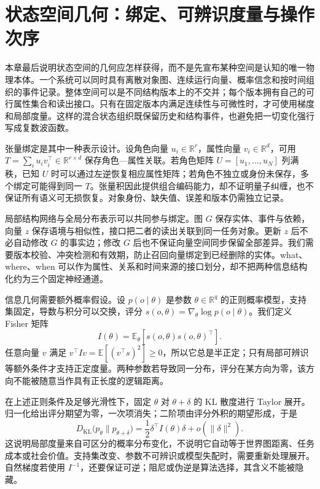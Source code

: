 \section{状态空间几何：绑定、可辨识度量与操作次序}
\label{sec:cognitive_space_ontology}

本章最后说明状态空间的几何应怎样获得，而不是先宣布某种空间是认知的唯一物理本体。一个系统可以同时具有离散对象图、连续运行向量、概率信念和按时间组织的事件记录。整体空间可以是不同结构版本上的不交并；每个版本拥有自己的可行属性集合和读出接口。只有在固定版本内满足连续性与可微性时，才可使用梯度和局部度量。这样的混合状态组织既保留历史和结构事件，也避免把一切变化强行写成复数波函数。

张量绑定是其中一种表示设计。设角色向量 $u_i\in\mathbb R^r$，属性向量 $v_i\in\mathbb R^d$，可用 $T=\sum_i u_i v_i^\top\in\mathbb R^{r\times d}$ 保存角色—属性关联。若角色矩阵 $U=[u_1,\ldots,u_N]$ 列满秩，已知 $U$ 时可以通过左逆恢复相应属性矩阵；若角色不独立或身份未保存，多个绑定可能得到同一 $T$。张量积因此提供组合编码能力，却不证明量子纠缠，也不保证所有语义可无损恢复。对象身份、缺失值、误差和版本仍需独立记录。

局部结构网络与全局分布表示可以共同参与绑定。图 $G$ 保存实体、事件与依赖，向量 $z$ 保存语境与相似性，接口把二者的读出关联到同一任务对象。更新 $z$ 后不必自动修改 $G$ 的事实边；修改 $G$ 后也不保证向量空间同步保留全部差异。我们需要版本校验、冲突检测和有效期，防止召回向量绑定到已经删除的实体。what、where、when 可以作为属性、关系和时间来源的接口划分，却不把两种信息结构化约为三个固定神经通道。

信息几何需要额外概率假设。设 $p(o\mid\theta)$ 是参数 $\theta\in\mathbb R^q$ 的正则概率模型，支持集固定，导数与积分可以交换，评分 $s(o,\theta)=\nabla_\theta\log p(o\mid\theta)$。我们定义 Fisher 矩阵
\begin{equation}
 I(\theta)=\mathbb E_\theta[s(o,\theta)s(o,\theta)^\top].
\end{equation}
任意向量 $v$ 满足 $v^\top Iv=\mathbb E[(v^\top s)^2]\ge0$，所以它总是半正定；只有局部可辨识等额外条件才支持正定度量。两种参数若导致同一分布，评分在某方向为零，该方向不能被随意当作具有正长度的逻辑距离。

在上述正则条件及足够光滑性下，固定 $\theta$ 对 $\theta+\delta$ 的 KL 散度进行 Taylor 展开。归一化给出评分期望为零，一次项消失；二阶项由评分外积的期望形成，于是
\begin{equation}
 D_{\mathrm{KL}}\bigl(p_\theta\|p_{\theta+\delta}\bigr)
 =\frac12\delta^\top I(\theta)\delta+o(\|\delta\|^2).
\end{equation}
这说明局部度量来自可区分的概率分布变化，不说明它自动等于世界图距离、任务成本或社会价值。支持集改变、参数不可辨识或模型失配时，需要重新处理展开。自然梯度若使用 $I^{-1}$，还要保证可逆；阻尼或伪逆是算法选择，其含义不能被隐藏。

